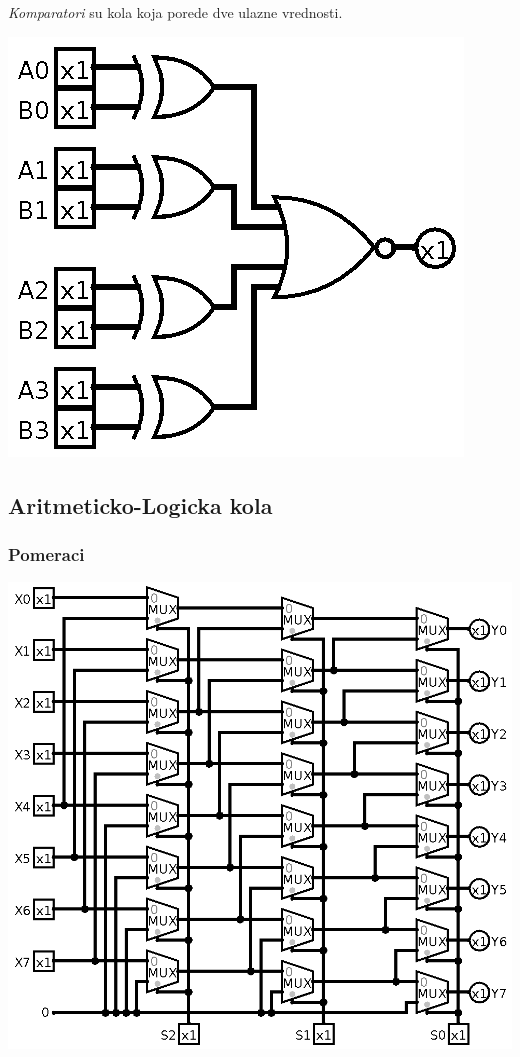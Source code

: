 \documentclass[12p,a4paper]{article}
\begin{document}
\begin{multicols}{2}
    \emph{Komparatori} su kola koja porede dve ulazne vrednosti.
    
    \includegraphics[width=0.6\columnwidth]{Figures/cmp_eq.png}

    \subsection{Aritmeticko-Logicka kola}


    \subsubsection{Pomeraci}

    \includegraphics[width=\columnwidth]{Figures/shifter.png}


\end{multicols}
\end{document}

